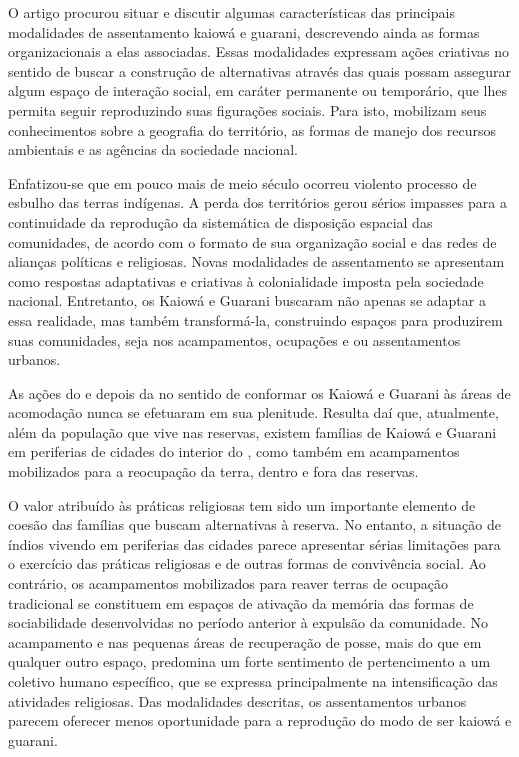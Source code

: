 O artigo procurou situar e discutir algumas características das
principais modalidades de assentamento kaiowá e guarani, descrevendo
ainda as formas organizacionais a elas associadas. Essas modalidades
expressam ações criativas no sentido de buscar a construção de
alternativas através das quais possam assegurar algum espaço de
interação social, em caráter permanente ou temporário, que lhes permita
seguir reproduzindo suas figurações sociais. Para isto, mobilizam seus
conhecimentos sobre a geografia do território, as formas de manejo dos
recursos ambientais e as agências da sociedade nacional. 

Enfatizou-se que em pouco mais de meio século ocorreu violento processo
de esbulho das terras indígenas. A perda dos territórios gerou sérios
impasses para a continuidade da reprodução da sistemática de disposição
espacial das comunidades, de acordo com o formato de sua organização
social e das redes de alianças políticas e religiosas. Novas
modalidades de assentamento se apresentam como respostas adaptativas e
criativas à colonialidade imposta pela sociedade nacional. Entretanto,
os Kaiowá e Guarani buscaram não apenas se adaptar a essa realidade,
mas também transformá-la, construindo espaços para produzirem suas
comunidades, seja nos acampamentos, ocupações e ou assentamentos
urbanos.

As ações do  e depois da  no sentido de conformar os Kaiowá e
Guarani às áreas de acomodação nunca se efetuaram em sua plenitude.
Resulta daí que, atualmente, além da população que vive nas reservas,
existem famílias de Kaiowá e Guarani em periferias de cidades do
interior do , como também em acampamentos mobilizados para a
reocupação da terra, dentro e fora das reservas.

O valor atribuído às práticas religiosas tem sido um importante elemento
de coesão das famílias que buscam alternativas à reserva. No entanto, a
situação de índios vivendo em periferias das cidades parece apresentar
sérias limitações para o exercício das práticas religiosas e de outras
formas de convivência social. Ao contrário, os acampamentos mobilizados
para reaver terras de ocupação tradicional se constituem em espaços de
ativação da memória das formas de sociabilidade desenvolvidas no
período anterior à expulsão da comunidade. No acampamento e nas
pequenas áreas de recuperação de posse, mais do que em qualquer outro
espaço, predomina um forte sentimento de pertencimento a um coletivo
humano específico, que se expressa principalmente na intensificação das
atividades religiosas. Das modalidades descritas, os assentamentos
urbanos parecem oferecer menos oportunidade para a reprodução do modo
de ser kaiowá e guarani. 

